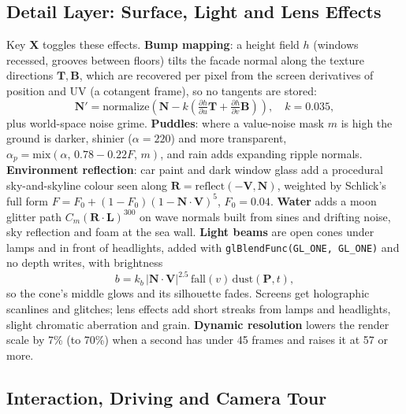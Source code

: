 \documentclass[12pt, a4paper]{report}
\begin{document}
\subsection{Detail Layer: Surface, Light and Lens Effects}

\begin{justify}
  {\fontsize{12}{13.8}\selectfont
    Key \textbf{X} toggles these effects. \textbf{Bump mapping}: a height field $h$ (windows recessed, grooves between floors) tilts the facade normal along the texture directions $\mathbf{T},\mathbf{B}$, which are recovered per pixel from the screen derivatives of position and UV (a cotangent frame), so no tangents are stored:
    \begin{equation}
      \mathbf{N}'=\mathrm{normalize}\!\left(\mathbf{N}-k\left(\tfrac{\partial h}{\partial u}\mathbf{T}+\tfrac{\partial h}{\partial v}\mathbf{B}\right)\right),\quad k=0.035,
    \end{equation}
    plus world-space noise grime. \textbf{Puddles}: where a value-noise mask $m$ is high the ground is darker, shinier ($\alpha=220$) and more transparent, $\alpha_p=\mathrm{mix}(\alpha,\,0.78-0.22F,\,m)$, and rain adds expanding ripple normals. \textbf{Environment reflection}: car paint and dark window glass add a procedural sky-and-skyline colour seen along $\mathbf{R}=\mathrm{reflect}(-\mathbf{V},\mathbf{N})$, weighted by Schlick's full form $F=F_0+(1-F_0)(1-\mathbf{N}\cdot\mathbf{V})^5$, $F_0=0.04$. \textbf{Water} adds a moon glitter path $C_m(\mathbf{R}\cdot\mathbf{L})^{300}$ on wave normals built from sines and drifting noise, sky reflection and foam at the sea wall. \textbf{Light beams} are open cones under lamps and in front of headlights, added with \texttt{glBlendFunc(GL\_ONE, GL\_ONE)} and no depth writes, with brightness
    \begin{equation}
      b = k_b\,|\mathbf{N}\cdot\mathbf{V}|^{2.5}\,\mathrm{fall}(v)\,\mathrm{dust}(\mathbf{P},t),
    \end{equation}
    so the cone's middle glows and its silhouette fades. Screens get holographic scanlines and glitches; lens effects add short streaks from lamps and headlights, slight chromatic aberration and grain. \textbf{Dynamic resolution} lowers the render scale by 7\% (to 70\%) when a second has under 45 frames and raises it at 57 or more.
  }
\end{justify}

\subsection{Interaction, Driving and Camera Tour}
\end{document}
